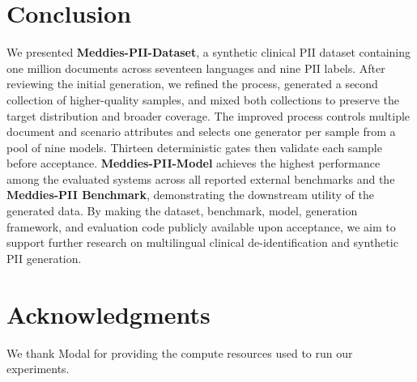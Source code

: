 \documentclass[11pt]{article}
\begin{document}
\section{Conclusion}

We presented \textbf{Meddies-PII-Dataset}, a synthetic clinical PII dataset containing one million documents across seventeen languages and nine PII labels. After reviewing the initial generation, we refined the process, generated a second collection of higher-quality samples, and mixed both collections to preserve the target distribution and broader coverage. The improved process controls multiple document and scenario attributes and selects one generator per sample from a pool of nine models. Thirteen deterministic gates then validate each sample before acceptance. \textbf{Meddies-PII-Model} achieves the highest performance among the evaluated systems across all reported external benchmarks and the \textbf{Meddies-PII Benchmark}, demonstrating the downstream utility of the generated data. By making the dataset, benchmark, model, generation framework, and evaluation code publicly available upon acceptance, we aim to support further research on multilingual clinical de-identification and synthetic PII generation.

\section*{Acknowledgments}

We thank Modal for providing the compute resources used to run our experiments.


\end{document}
